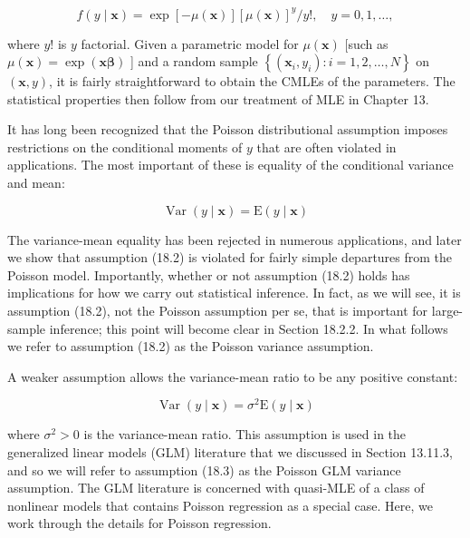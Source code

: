 \documentclass[10pt]{article}
\begin{document}
\begin{equation*}
f(y \mid \mathbf{x})=\exp [-\mu(\mathbf{x})][\mu(\mathbf{x})]^{y} / y!, \quad y=0,1, \ldots, \tag{18.1}
\end{equation*}


where $y!$ is $y$ factorial. Given a parametric model for $\mu(\mathbf{x})$ [such as $\mu(\mathbf{x})=\exp (\mathbf{x} \boldsymbol{\beta})$ ] and a random sample $\left\{\left(\mathbf{x}_{i}, y_{i}\right): i=1,2, \ldots, N\right\}$ on $(\mathbf{x}, y)$, it is fairly straightforward to obtain the CMLEs of the parameters. The statistical properties then follow from our treatment of MLE in Chapter 13.

It has long been recognized that the Poisson distributional assumption imposes restrictions on the conditional moments of $y$ that are often violated in applications. The most important of these is equality of the conditional variance and mean:


\begin{equation*}
\operatorname{Var}(y \mid \mathbf{x})=\mathrm{E}(y \mid \mathbf{x}) \tag{18.2}
\end{equation*}


The variance-mean equality has been rejected in numerous applications, and later we show that assumption (18.2) is violated for fairly simple departures from the Poisson model. Importantly, whether or not assumption (18.2) holds has implications for how we carry out statistical inference. In fact, as we will see, it is assumption (18.2), not the Poisson assumption per se, that is important for large-sample inference; this point will become clear in Section 18.2.2. In what follows we refer to assumption (18.2) as the Poisson variance assumption.

A weaker assumption allows the variance-mean ratio to be any positive constant:


\begin{equation*}
\operatorname{Var}(y \mid \mathbf{x})=\sigma^{2} \mathrm{E}(y \mid \mathbf{x}) \tag{18.3}
\end{equation*}


where $\sigma^{2}>0$ is the variance-mean ratio. This assumption is used in the generalized linear models (GLM) literature that we discussed in Section 13.11.3, and so we will refer to assumption (18.3) as the Poisson GLM variance assumption. The GLM literature is concerned with quasi-MLE of a class of nonlinear models that contains Poisson regression as a special case. Here, we work through the details for Poisson regression.
\end{document}
